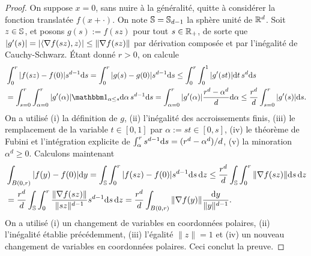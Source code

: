 \begin{proof}

	On suppose $x=0$, sans nuire à la généralité, quitte à considérer la fonction translatée $f(x+\cdot)$. On note $\mathbb{S} = \mathbb{S}_{d-1}$ la sphère unité de $\mathbb{R}^d$. Soit $z \in \mathbb{S}$, et posons $g(s) := f(s z)$ pour tout $s\in \mathbb{R}_+$, de sorte que $|g'(s)| = |\langle\nabla f(s z),z\rangle| \leq \|\nabla f(s z)\|$ par dérivation composée et par l'inégalité de Cauchy-Schwarz. 
	Étant donné $r>0$, on calcule
\begin{align*}
	&\int_0^r |f(s z)-f(0)| s^{d-1} \diff s
	= \int_0^r |g(s)-g(0)| s^{d-1} \diff s 
	\leq \int_0^r \int_0^1 |g'(st)| \diff t \, s^d \diff s \\
	&= \int_{s=0}^r \int_{\alpha=0}^r |g'(\alpha)| \bbone_{\alpha \leq s} \diff \alpha \, s^{d-1} \diff s
	=\int_{\alpha=0}^r |g'(\alpha)| \frac{r^d-\alpha^d}{d} \diff \alpha \leq \frac{r^d}{d} \int_{s=0}^r |g'(s)| \diff s.
\end{align*}
On a utilisé (i) la définition de $g$, (ii) l'inégalité des accroissements finis, (iii) le remplacement de la variable $t \in [0,1]$ par $\alpha := s t \in [0,s]$, (iv) le théorème de Fubini et l'intégration explicite de $\int_\alpha^r s^{d-1} \mathrm{d} s = (r^d-\alpha^d)/d$, (v) la minoration $\alpha^d \geq 0$. 
Calculons maintenant %
\begin{align*}
	&\int_{B(0,r)} |f(y)-f(0)| \mathrm{d} y = \int_{\mathbb{S}} \int_0^r |f(s z)-f(0)| s^{d-1} \mathrm{d} s \, \mathrm{d} z
	\leq \frac{r^d}{d} \int_{\mathbb{S}} \int_0^r\|\nabla f(s z)\| \mathrm{d} s \, \mathrm{d} z\\
	&= \frac{r^d}{d} \int_{\mathbb{S}} \int_0^r\frac{\|\nabla f(s z)\|}{\|s z\|^{d-1}} s^{d-1}\mathrm{d} s \, \mathrm{d} z
	= \frac{r^d}{d} \int_{B(0,r)} \| \nabla f(y)\| \frac{\mathrm{d} y} {\|y\|^{d-1}}. 
\end{align*}
On a utilisé (i) un changement de variables en coordonnées polaires, (ii) l'inégalité établie précédemment, (iii) l'égalité $\|z\|=1$ et (iv) un nouveau changement de variables en coordonnées polaires. Ceci conclut la preuve.
\end{proof}

